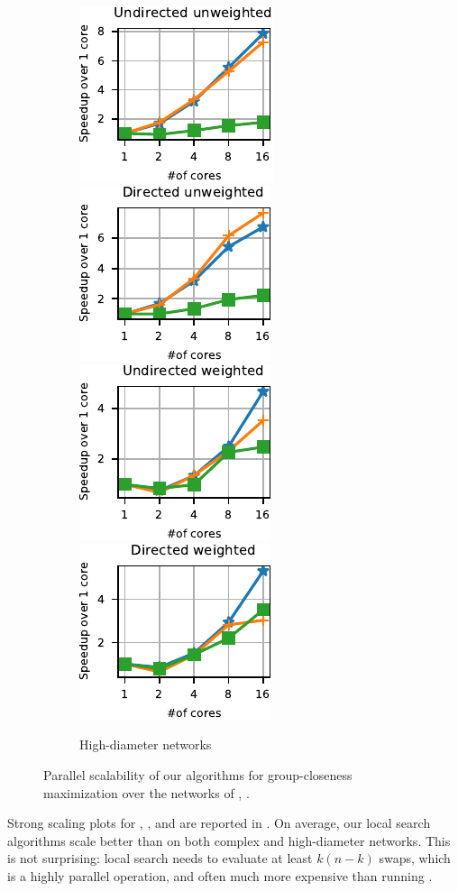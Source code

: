 \begin{figure}[tb]
\begin{subfigure}[t]{\textwidth}
\centering
\includegraphics[width=.24\textwidth]{./sources/plots/gh-gc-apx/par-speedup-high-diameter-undirected-unweighted.pdf}
\includegraphics[width=.24\textwidth]{./sources/plots/gh-gc-apx/par-speedup-high-diameter-directed-unweighted.pdf}
\includegraphics[width=.24\textwidth]{./sources/plots/gh-gc-apx/par-speedup-high-diameter-undirected-weighted.pdf}
\includegraphics[width=.24\textwidth]{./sources/plots/gh-gc-apx/par-speedup-high-diameter-directed-weighted.pdf}
\caption{High-diameter networks}
\label{fig:gh-gc-apx:par-speed-high-diam}
\end{subfigure}

\caption{Parallel scalability of our algorithms for group-closeness maximization
over the networks of , .}
\label{fig:gh-gc-apx:par-speed}
\end{figure}

Strong scaling plots for \gslsc, \greedylsc, and \greedyc are reported in
. On average, our local search algorithms scale
better than \greedyc on both complex and high-diameter networks. This is not
surprising: local search needs to evaluate at least $k(n - k)$ swaps,
which is a highly parallel operation, and often much more expensive than
running \greedyc.

